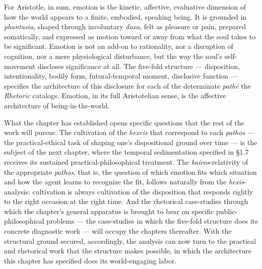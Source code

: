 For Aristotle, in sum, emotion is the kinetic, affective, evaluative dimension of how the world appears to a finite, embodied, speaking being. It is grounded in \textit{phantasia}, shaped through involuntary \textit{doxa}, felt as pleasure or pain, prepared somatically, and expressed as motion toward or away from what the soul takes to be significant. Emotion is not an add-on to rationality, nor a disruption of cognition, nor a mere physiological disturbance, but the way the soul's self-movement discloses significance at all. The five-fold structure --- disposition, intentionality, bodily form, futural-temporal moment, disclosive function --- specifies the architecture of this disclosure for each of the determinate \textit{pathē} the \textit{Rhetoric} catalogs. Emotion, in its full Aristotelian sense, is the affective architecture of being-in-the-world.

What the chapter has established opens specific questions that the rest of the work will pursue. The cultivation of the \textit{hexeis} that correspond to each \textit{pathos} --- the practical-ethical task of shaping one's dispositional ground over time --- is the subject of the next chapter, where the temporal sedimentation specified in \S1.7 receives its sustained practical-philosophical treatment. The \textit{kairos}-relativity of the appropriate \textit{pathos}, that is, the question of which emotion fits which situation and how the agent learns to recognize the fit, follows naturally from the \textit{hexis}-analysis: cultivation is always cultivation of the disposition that responds rightly to the right occasion at the right time. And the rhetorical case-studies through which the chapter's general apparatus is brought to bear on specific public-philosophical problems --- the case-studies in which the five-fold structure does its concrete diagnostic work --- will occupy the chapters thereafter. With the structural ground secured, accordingly, the analysis can now turn to the practical and rhetorical work that the structure makes possible, in which the architecture this chapter has specified does its world-engaging labor.
